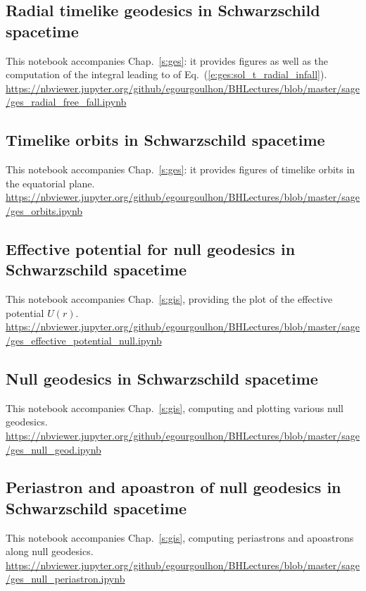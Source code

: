 \subsection{Radial timelike geodesics in Schwarzschild spacetime} \label{s:sam:ges_radial_free_fall}

This notebook accompanies Chap.~\ref{s:ges}: it provides
figures as well as the computation of
the integral leading to
of Eq.~(\ref{e:ges:sol_t_radial_infall}).\\[1ex]
{\footnotesize
\url{https://nbviewer.jupyter.org/github/egourgoulhon/BHLectures/blob/master/sage/ges_radial_free_fall.ipynb}
}

\subsection{Timelike orbits in Schwarzschild spacetime} \label{s:sam:ges_orbits}
%
This notebook accompanies Chap.~\ref{s:ges}: it provides
figures of timelike orbits in the equatorial plane.\\[1ex]
{\footnotesize
\url{https://nbviewer.jupyter.org/github/egourgoulhon/BHLectures/blob/master/sage/ges_orbits.ipynb}
}

\subsection{Effective potential for null geodesics in Schwarzschild spacetime} \label{s:sam:ges_eff_pot_null}
%
This notebook accompanies Chap.~\ref{s:gis}, providing the plot of the
effective potential $U(r)$.\\[1ex]
{\footnotesize
\url{https://nbviewer.jupyter.org/github/egourgoulhon/BHLectures/blob/master/sage/ges_effective_potential_null.ipynb}
}

\subsection{Null geodesics in Schwarzschild spacetime} \label{s:sam:ges_null_geod}
%
This notebook accompanies Chap.~\ref{s:gis}, computing and plotting various
null geodesics.\\[1ex]
{\footnotesize
\url{https://nbviewer.jupyter.org/github/egourgoulhon/BHLectures/blob/master/sage/ges_null_geod.ipynb}
}

\subsection{Periastron and apoastron of null geodesics in Schwarzschild spacetime} \label{s:sam:ges_null_periastron}
%
This notebook accompanies Chap.~\ref{s:gis}, computing periastrons and apoastrons
along null geodesics.\\[1ex]
{\footnotesize
\url{https://nbviewer.jupyter.org/github/egourgoulhon/BHLectures/blob/master/sage/ges_null_periastron.ipynb}
}

